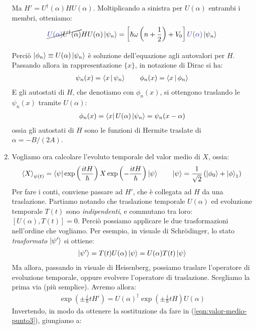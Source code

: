 \documentclass[../../FisicaTeorica.tex]{subfiles}
\begin{document}
\begin{enumerate}
Ma $H'=U^\dag(\alpha) H U(\alpha)$. Moltiplicando a sinistra per $U(\alpha)$ entrambi i membri, otteniamo:
\begin{align*}
\cancel{\textcolor{Blue}{U(\alpha)}U^\dag(\alpha)}HU(\alpha)\ket{\psi_n} = \left[\hbar \omega \left(n+\frac{1}{2}\right)+V_0\right] \textcolor{Blue}{U(\alpha)}\ket{\psi_n}
\end{align*}

Perciò $\Ket{\phi_n}\equiv U(\alpha)\Ket{\psi_n}$ è soluzione dell'equazione agli autovalori per $H$. Passando allora in rappresentazione $\{x\}$, in notazione di Dirac si ha:
\begin{align*}
\psi_n(x) = \Braket{x|\psi_n} \qquad \phi_n(x)=\Braket{x|\phi_n}
\end{align*}
E gli autostati di $H$, che denotiamo con $\phi_n(x)$, si ottengono traslando le $\psi_n(x)$ tramite $U(\alpha)$:
\begin{align*}
\phi_n(x) = \Bra{x}U(\alpha)\Ket{\psi_n} = \psi_n(x-\alpha)
\end{align*}
ossia gli autostati di $H$ sono le funzioni di Hermite traslate di $\alpha = -B/(2A)$.
\item Vogliamo ora calcolare l'evoluto temporale del valor medio di $X$, ossia:
\begin{align}
\left\langle{X}\right\rangle_{\psi(t)} =\Bra{\psi} \exp\left(\frac{itH}{\hbar}\right) X \exp\left(-\frac{itH}{\hbar}\right)\Ket{\psi} \qquad \Ket{\psi}=\frac{1}{\sqrt{2}}\left(\Ket{\phi_0} + \Ket{\phi}_1\right)
\label{eqn:valor-medio-punto3}
\end{align}
Per fare i conti, conviene passare ad $H'$, che è collegata ad $H$ da una traslazione. Partiamo notando che traslazione temporale $U(\alpha)$ ed evoluzione temporale $T(t)$ sono \textit{indipendenti}, e commutano tra loro: $[U(\alpha),T(t)]=0$. Perciò possiamo applicare le due trasformazioni nell'ordine che vogliamo. Per esempio, in visuale di Schr\"odinger, lo stato \textit{trasformato} $\Ket{\psi'}$ si ottiene:
\begin{align*}
\Ket{\psi'}=T(t)U(\alpha)\Ket{\psi} = U(\alpha) T(t)\Ket{\psi}
\end{align*}
Ma allora, passando in visuale di Heisenberg, possiamo traslare l'operatore di evoluzione temporale, oppure evolvere l'operatore di traslazione. Scegliamo la prima via (più semplice). Avremo allora:
\begin{align*}
\exp\left(\pm \frac{i}{\hbar}tH'\right)=U(\alpha)^\dag \exp\left(\pm \frac{i}{\hbar}tH\right)U(\alpha)
\end{align*}
Invertendo, in modo da ottenere la sostituzione da fare in (\ref{eqn:valor-medio-punto3}), giungiamo a:

\end{enumerate}
\end{document}
